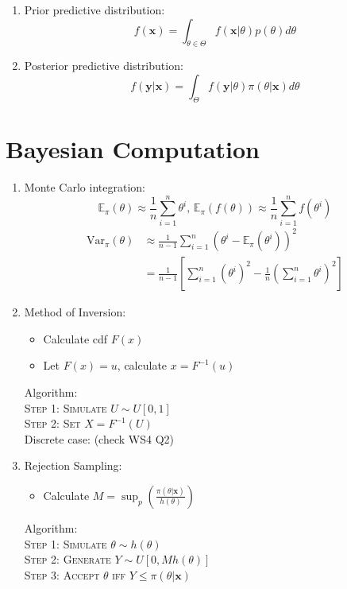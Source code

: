 \documentclass[11pt,a4paper]{article}
\begin{document}
\begin{multicols}{2}
\begin{enumerate}
\item Prior predictive distribution: 
$$f(\boldsymbol x) = \int_{\theta \in \Theta} f(\boldsymbol x|\theta) p(\theta) d\theta$$
\item Posterior predictive distribution: 
$$f(\boldsymbol y|\boldsymbol x) = \int_{\Theta} f(\boldsymbol y|\theta) \pi(\theta|\boldsymbol x) d\theta$$
\end{enumerate}

\section*{Bayesian Computation}
\begin{enumerate}[resume]
\item Monte Carlo integration: \\
$$\mathbb{E}_\pi (\theta) \approx \frac{1}{n} \sum_{i=1}^n \theta^i \text{, } \mathbb{E}_\pi \left(f(\theta)\right) \approx \frac{1}{n} \sum_{i=1}^n f(\theta^i)$$
\begin{align*}
\mathrm{Var}_\pi (\theta) &\approx \frac{1}{n-1} \sum_{i=1}^n \left( \theta^i - \mathbb{E}_\pi (\theta^i) \right)^2 \\
&= \frac{1}{n-1} \left[ \sum_{i=1}^n (\theta^i)^2 - \frac{1}{n} \left( \sum_{i=1}^n \theta^i \right)^2 \right]
\end{align*}

\item Method of Inversion: 
\begin{itemize}
\item Calculate cdf $F(x)$
\item Let $F(x)=u$, calculate $x=F^{-1}(u)$
\end{itemize}
Algorithm: \\
\textsc{Step 1: Simulate} $U \sim U[0,1]$ \\
\textsc{Step 2: Set} $X = F^{-1}(U)$ \\
Discrete case: (check WS4 Q2)

\item Rejection Sampling: 
\begin{itemize}
\item Calculate $\displaystyle M = \sup_p \left( \frac{\pi(\theta|\boldsymbol x)}{h(\theta)} \right)$
\end{itemize}
Algorithm: \\
\textsc{Step 1: Simulate} $\theta \sim h(\theta)$ \\
\textsc{Step 2: Generate} $Y \sim U[0,Mh(\theta)]$ \\
\textsc{Step 3: Accept} $\theta$ \textsc{iff} $Y \leq \pi(\theta|\boldsymbol x)$


\end{enumerate}
\end{multicols}
\end{document}
